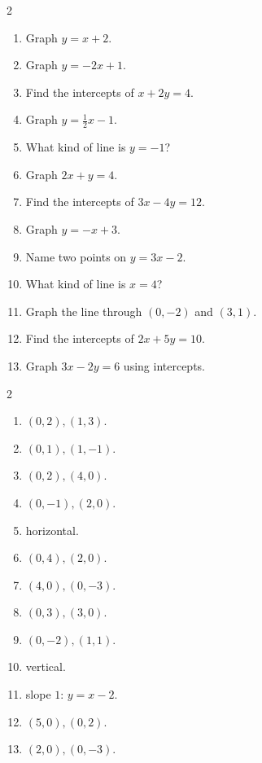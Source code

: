 \documentclass[11pt]{article}
\begin{document}
\begin{recapbox}
\begin{multicols}{2}
\small
\begin{enumerate}[leftmargin=*,itemsep=3pt]
  \item Graph $y=x+2$.
  \item Graph $y=-2x+1$.
  \item Find the intercepts of $x+2y=4$.
  \item Graph $y=\tfrac12x-1$.
  \item What kind of line is $y=-1$?
  \item Graph $2x+y=4$.
  \item Find the intercepts of $3x-4y=12$.
  \item Graph $y=-x+3$.
  \item Name two points on $y=3x-2$.
  \item What kind of line is $x=4$?
  \item Graph the line through $(0,-2)$ and $(3,1)$.
  \item Find the intercepts of $2x+5y=10$.
  \item Graph $3x-2y=6$ using intercepts.
\end{enumerate}
\end{multicols}
\end{recapbox}

\begin{keybox}
\begin{multicols}{2}
\small
\begin{enumerate}[leftmargin=*,itemsep=3pt]
  \item $(0,2),(1,3)$.
  \item $(0,1),(1,-1)$.
  \item $(0,2),(4,0)$.
  \item $(0,-1),(2,0)$.
  \item horizontal.
  \item $(0,4),(2,0)$.
  \item $(4,0),(0,-3)$.
  \item $(0,3),(3,0)$.
  \item $(0,-2),(1,1)$.
  \item vertical.
  \item slope $1$: $y=x-2$.
  \item $(5,0),(0,2)$.
  \item $(2,0),(0,-3)$.
\end{enumerate}
\end{multicols}
\end{keybox}
\end{document}
